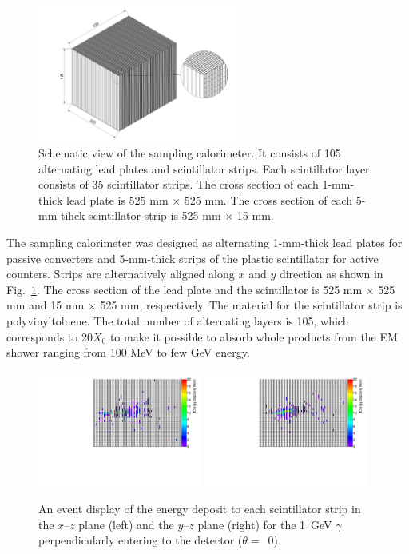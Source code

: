 \documentclass[jkps,preprint,fleqn,showpacs,showkeys]{revtex4}
\begin{document}
\begin{figure}[!hbt]
\includegraphics[width=0.6\textwidth]{figures/FullLayer_2.jpeg}
\caption{ Schematic view of the sampling calorimeter. It consists of 105 alternating lead plates and scintillator strips. Each scintillator layer consists of 35 scintillator strips. The cross section of each 1-mm-thick lead plate is 525 mm $\times$ 525 mm. The cross section of each 5-mm-tihck scintillator strip is 525 mm $\times$ 15 mm. }
\label{fig:det_conf}
\end{figure}

The sampling calorimeter was designed as alternating 1-mm-thick lead plates for passive converters and 5-mm-thick strips of the plastic scintillator for active counters. Strips are alternatively aligned along $x$ and $y$ direction as shown in Fig.~\ref{fig:det_conf}. The cross section of the lead plate and the scintillator is 525 mm $\times$ 525 mm and 15 mm $\times$ 525 mm, respectively. The material for the scintillator strip is polyvinyltoluene. The total number of alternating layers is 105, which corresponds to 20$X_{0}$ to make it possible to absorb whole products from the EM shower ranging from 100 MeV to few GeV energy.

\begin{figure}[!hbt]
\includegraphics[width=0.48\textwidth]{figures/SingleEventXZHit.pdf}
\includegraphics[width=0.48\textwidth]{figures/SingleEventYZHit.pdf}
\caption{ An event display of the energy deposit to each scintillator strip in the $x$--$z$ plane (left) and the $y$--$z$ plane (right) for the 1~GeV $\gamma$ perpendicularly entering to the detector ($\theta=$~0).}
\label{fig:Evt_Dis}
\end{figure}
\end{document}
